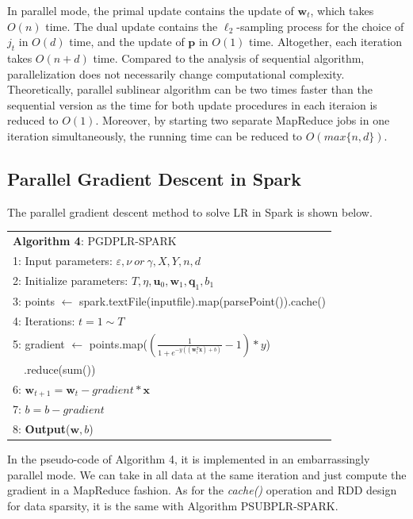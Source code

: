 \documentclass[10pt, conference, compsocconf]{IEEEtran}
\newcommand{\bw}{\mathbf{w}}
\newcommand{\bp}{\mathbf{p}}
\newcommand{\bq}{\mathbf{q}}
\newcommand{\tspace}{\hspace*{2em}}
\begin{document}
In parallel mode, the primal update contains the update of $\bw_t$, which takes $O(n)$ time.
The dual update contains the $\ell_2$-sampling process for the choice of $j_t$ in $O(d)$ time, and the update of $\bp$ in $O(1)$ time.
Altogether, each iteration takes $O(n+d)$ time.
Compared to the analysis of sequential algorithm, parallelization does not necessarily change computational complexity.
Theoretically, parallel sublinear algorithm can be two times faster than the sequential version as the time for both update procedures in each iteraion is reduced to $O(1)$.
Moreover, by starting two separate MapReduce jobs in one iteration simultaneously, the running time can be reduced to $O(max\{n,d\})$.

\subsection{Parallel Gradient Descent in Spark}
The parallel gradient descent method to solve LR in Spark is shown below.
    \begin{table}[ht]
	\begin{tabular}{l}
    \hline\noalign{\smallskip}
	\textbf{Algorithm 4}: PGDPLR-SPARK \\
	\noalign{\smallskip}
	\hline
	\noalign{\smallskip}
    1:  Input parameters: $\varepsilon, \nu~or~\gamma, X, Y, n, d$ \\
    2:	Initialize parameters: $T, \eta, {\mathbf{u}}_{0}, {\bw}_{1}, {\mathbf{\bq}}_{1}, {b}_{1}$\\
    3:  points $\leftarrow$ spark.textFile(inputfile).map(parsePoint()).cache() \\
    4:  Iterations: $t=1 \sim T$ \\
    5:  \tspace gradient $\leftarrow$ points.map($(\frac{1}{1+e^{-y((\bw_t^T \textbf{x})+b)}}-1)*y$) \\
        ~~\tspace\tspace\tspace\tspace\tspace .reduce(sum()) \\
    6:  \tspace $\bw_{t+1} = \bw_t - gradient * \textbf{x}$ \\
    7:  \tspace $b = b - gradient$ \\
    8:  \textbf{Output}($\bw, b$) \\
    \hline
    \end{tabular}
	\end{table}

In the pseudo-code of Algorithm 4, it is implemented in an embarrassingly parallel mode.
We can take in all data at the same iteration and just compute the gradient in a MapReduce fashion.
As for the \textit{cache()} operation and RDD design for data sparsity, it is the same with Algorithm PSUBPLR-SPARK.
\end{document}
